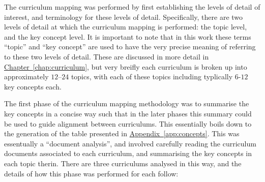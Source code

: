\documentclass[twoside,12pt,a4paper]{report}
\newcommand{\refchap}[1]{\hyperref[chap:#1]{Chapter~\ref{chap:#1}}}
\newcommand{\refapp}[1]{\hyperref[app:#1]{Appendix~\ref{app:#1}}}
\begin{document}
The curriculum mapping was performed by first establishing the levels of detail of interest, and terminology for these levels of detail. Specifically, there are two levels of detail at which the curriculum mapping is performed: the topic level, and the key concept level. It is important to note that in this work these terms ``topic'' and ``key concept'' are used to have the very precise meaning of referring to these two levels of detail. These are discussed in more detail in \refchap{curriculum}, but very breifly each curriculum is broken up into approximately $12$--$24$ topics, with each of these topics including typlically $6$-$12$ key concepts each. 

The first phase of the curriculum mapping methodology was to summarise the key concepts in a concise way such that in the later phases this summary could be used to guide alignment between curriculums. This essentially boils down to the generation of the table presented in \refapp{concepts}. This was essentually a ``document analysis'', and involved carefully reading the curriculum documents associated to each curriculum, and summarising the key concepts in each topic therin. There are three curriculums analysed in this way, and the details of how this phase was performed for each follow:
\end{document}
